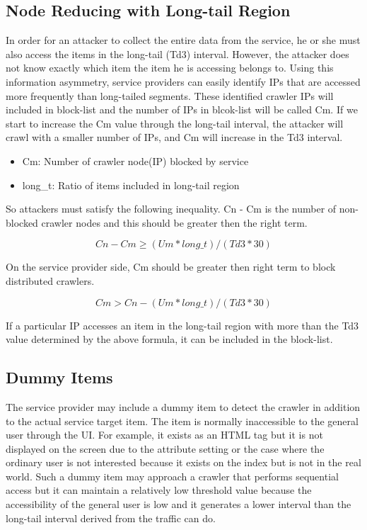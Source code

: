 \documentclass[sigconf,anonymous=false]{acmart}
\begin{document}
\subsection{Node Reducing with Long-tail Region}
In order for an attacker to collect the entire data from the service, he or she must also access the items in the long-tail (Td3) interval. However, the attacker does not know exactly which item the item he is accessing belongs to. Using this information asymmetry, service providers can easily identify IPs that are accessed more frequently than long-tailed segments. These identified crawler IPs will included in block-list and the number of IPs in blcok-list will be called Cm. If we start to increase the Cm value through the long-tail interval, the attacker will crawl with a smaller number of IPs, and Cm will increase in the Td3 interval.

\begin{itemize}
\item Cm: Number of crawler node(IP) blocked by service
\item long\_t: Ratio of items included in long-tail region
\end{itemize}

So attackers must satisfy the following inequality. Cn - Cm is the number of non-blocked crawler nodes and this should be greater then the right term.

  \begin{displaymath}
Cn - Cm \geq (Um * long\_t) / (Td3 * 30)
  \end{displaymath}\newline

On the service provider side, Cm should be greater then right term to block distributed crawlers.

  \begin{displaymath}
Cm > Cn - (Um * long\_t) / (Td3 * 30)
  \end{displaymath}\newline

If a particular IP accesses an item in the long-tail region with more than the Td3 value determined by the above formula, it can be included in the block-list.


\subsection{Dummy Items}
The service provider may include a dummy item to detect the crawler in addition to the actual service target item. The item is normally inaccessible to the general user through the UI. For example, it exists as an HTML tag but it is not displayed on the screen due to the attribute setting or the case where the ordinary user is not interested because it exists on the index but is not in the real world.
Such a dummy item may approach a crawler that performs sequential access but it can maintain a relatively low threshold value because the accessibility of the general user is low and it generates a lower interval than the long-tail interval derived from the traffic can do.
\end{document}
